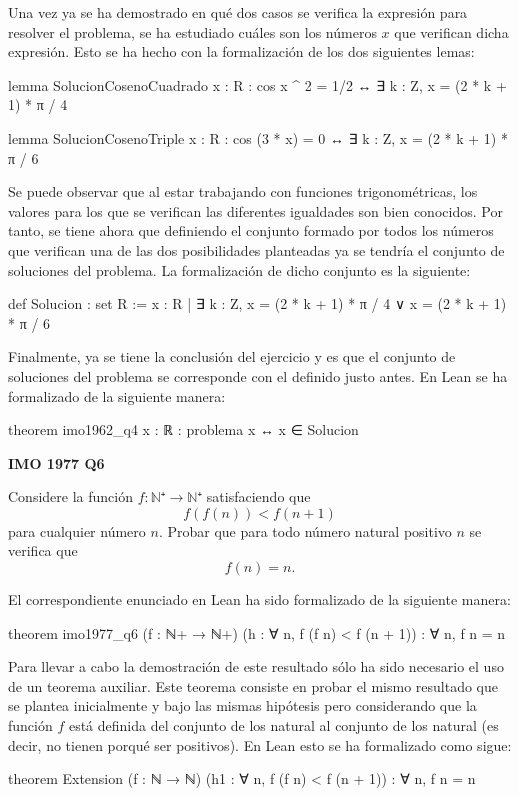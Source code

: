 Una vez ya se ha demostrado en qué dos casos se verifica la expresión para
resolver el problema, se ha estudiado cuáles son los números \(x\) que verifican
dicha expresión. Esto se ha hecho con la formalización de los dos siguientes
lemas:
\begin{leancode}
lemma SolucionCosenoCuadrado
  {x : R}
  : cos x ^ 2 = 1/2 ↔ ∃ k : Z, x = (2 * k + 1) * π / 4

lemma SolucionCosenoTriple
  {x : R}
  : cos (3 * x) = 0 ↔ ∃ k : Z, x = (2 * k + 1) * π / 6
\end{leancode}

Se puede observar que al estar trabajando con funciones trigonométricas, los
valores para los que se verifican las diferentes igualdades son bien conocidos.
Por tanto, se tiene ahora que definiendo el conjunto formado por todos los
números que verifican una de las dos posibilidades planteadas ya se tendría
el conjunto de soluciones del problema. La formalización de dicho conjunto es
la siguiente:
\begin{leancode}
def Solucion : set R :=
{x : R | ∃ k : Z, x = (2 * k + 1) * π / 4 ∨ x = (2 * k + 1) * π / 6}
\end{leancode}

Finalmente, ya se tiene la conclusión del ejercicio y es que el conjunto de
soluciones del problema se corresponde con el definido justo antes. En Lean se
ha formalizado de la siguiente manera:

\begin{leancode}
theorem imo1962_q4
  {x : ℝ}
  : problema x ↔ x ∈ Solucion
\end{leancode}


\textbf{IMO 1977 Q6}

\noindent
Considere la función
\(f:ℕ⁺ → ℕ⁺\) satisfaciendo que
\[f(f(n)) < f(n+1)\]
para cualquier número \(n\). Probar que para todo número
natural positivo \(n\) se verifica que
\[f(n) = n.\]

El correspondiente enunciado en Lean ha sido formalizado de la siguiente manera:
\begin{leancode}
theorem imo1977_q6
  (f : ℕ+ → ℕ+)
  (h : ∀ n, f (f n) < f (n + 1))
  : ∀ n, f n = n
\end{leancode}

Para llevar a cabo la demostración de este resultado sólo ha sido necesario el
uso de un teorema auxiliar. Este teorema consiste en probar el mismo resultado
que se plantea inicialmente y bajo las mismas hipótesis pero considerando
que la función \(f\) está definida del conjunto de los natural al conjunto
de los natural (es decir, no tienen porqué ser positivos). En Lean esto se ha
formalizado como sigue:
\begin{leancode}
theorem Extension
  (f : ℕ → ℕ)
  (h1 : ∀ n, f (f n) < f (n + 1))
  : ∀ n, f n = n
\end{leancode}

